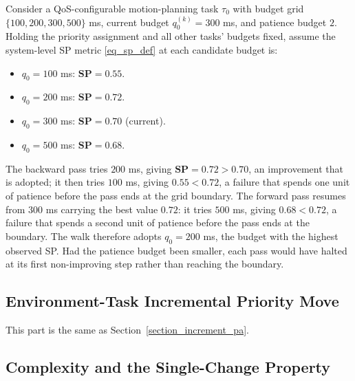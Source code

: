     \begin{Example}
        Consider a QoS-configurable motion-planning task $\tau_0$ with budget grid $\{100, 200, 300, 500\}$ ms, current budget $q_0^{(k)} = 300$ ms, and patience budget $2$.
        Holding the priority assignment and all other tasks' budgets fixed, assume the system-level SP metric \eqref{eq_sp_def} at each candidate budget is:
    \begin{itemize}
        \item $q_0 = 100$ ms: $\textbf{SP} = 0.55$.
        \item $q_0 = 200$ ms: $\textbf{SP} = 0.72$.
        \item $q_0 = 300$ ms: $\textbf{SP} = 0.70$ (current).
        \item $q_0 = 500$ ms: $\textbf{SP} = 0.68$.
    \end{itemize}

        The backward pass tries $200$ ms, giving $\textbf{SP} = 0.72 > 0.70$, an improvement that is adopted; it then tries $100$ ms, giving $0.55 < 0.72$, a failure that spends one unit of patience before the pass ends at the grid boundary.
        The forward pass resumes from $300$ ms carrying the best value $0.72$: it tries $500$ ms, giving $0.68 < 0.72$, a failure that spends a second unit of patience before the pass ends at the boundary.
        The walk therefore adopts $q_0 = 200$ ms, the budget with the highest observed SP.
        Had the patience budget been smaller, each pass would have halted at its first non-improving step rather than reaching the boundary.
    \end{Example}
    

    \subsection{Environment-Task Incremental Priority Move}
    \label{section_env_pa_move}

    This part is the same as Section~\ref{section_increment_pa}.

    \subsection{Complexity and the Single-Change Property}
    \label{section_complexity_single_change}

